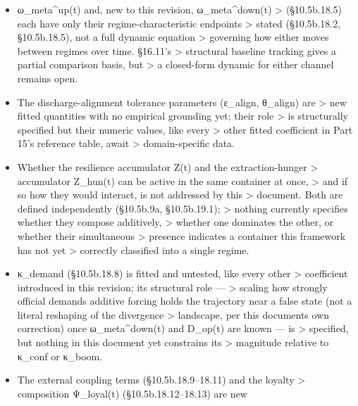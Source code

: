 \documentclass[
]{article}
\begin{document}
\begin{itemize}
  §8.5's network \textgreater{} propagation, are both left to the domain
  adapter by design. \textgreater{} Nothing in the engine can verify
  that a given σ\_i or projection \textgreater{} choice is reasonable
  --- that judgment is inherently substantive \textgreater{} and
  domain-specific.
\item
  ω\_meta\^{}up(t) and, new to this revision, ω\_meta\^{}down(t)
  \textgreater{} (§10.5b.18.5) each have only their
  regime-characteristic endpoints \textgreater{} stated (§10.5b.18.2,
  §10.5b.18.5), not a full dynamic equation \textgreater{} governing how
  either moves between regimes over time. §16.11's \textgreater{}
  structural baseline tracking gives a partial comparison basis, but
  \textgreater{} a closed-form dynamic for either channel remains open.
\item
  The discharge-alignment tolerance parameters (ε\_align, θ\_align) are
  \textgreater{} new fitted quantities with no empirical grounding yet;
  their role \textgreater{} is structurally specified but their numeric
  values, like every \textgreater{} other fitted coefficient in Part
  15's reference table, await \textgreater{} domain-specific data.
\item
  Whether the resilience accumulator Z(t) and the extraction-hunger
  \textgreater{} accumulator Z\_hun(t) can be active in the same
  container at once, \textgreater{} and if so how they would interact,
  is not addressed by this \textgreater{} document. Both are defined
  independently (§10.5b.9a, §10.5b.19.1); \textgreater{} nothing
  currently specifies whether they compose additively, \textgreater{}
  whether one dominates the other, or whether their simultaneous
  \textgreater{} presence indicates a container this framework has not
  yet \textgreater{} correctly classified into a single regime.
\item
  κ\_demand (§10.5b.18.8) is fitted and untested, like every other
  \textgreater{} coefficient introduced in this revision; its structural
  role --- \textgreater{} scaling how strongly official demands additive
  forcing holds the trajectory near a false state (not a literal
  reshaping of the divergence \textgreater{} landscape, per this
  documents own correction) once ω\_meta\^{}down(t) and D\_op(t) are
  known --- is \textgreater{} specified, but nothing in this document
  yet constrains its \textgreater{} magnitude relative to κ\_conf or
  κ\_boom.
\item
  The external coupling terms (§10.5b.18.9--18.11) and the loyalty
  \textgreater{} composition Ψ\_loyal(t) (§10.5b.18.12--18.13) are new

\end{itemize}
\end{document}

